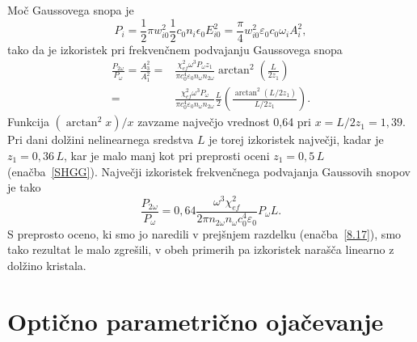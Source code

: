 Moč Gaussovega snopa je
\begin{equation}
P_{i}=\frac{1}{2}\pi w_{i0}^{2} \frac{1}{2}c_0 n_i \epsilon_{0}E_{i0}^{2}=
\frac{\pi}{4}w_{i0}^{2}\varepsilon_0 c_0 \omega_{i} A_{i}^{2},
\label{8.26}
\end{equation}
tako da je izkoristek pri frekvenčnem podvajanju Gaussovega snopa 
\begin{align}
\frac{P_{2\omega}}{P_{\omega}}=\frac{A_3^2}{A_1^2}  = &
\frac{\chi_{ef}^2 \omega^3 P_\omega z_1}{\pi c_0^4 \varepsilon_0 n_\omega n_{2\omega}} 
\arctan^2 \left( \frac{L}{2z_1}\right) \nonumber\\
 = &\frac{\chi_{ef}^2 \omega^3 P_\omega}{\pi c_0^4 \varepsilon_0 n_\omega n_{2\omega}} \frac{L}{2}
\left(\frac {\arctan^2 \left( L/2z_1\right)}{L/2z_1}\right)\!.
\label{8.27}
\end{align}
Funkcija $(\arctan^{2}x)/x$ zavzame največjo vrednost 0,64 pri $x =L/2z_1=1,39$.
Pri dani dolžini nelinearnega sredstva $L$ je torej 
izkoristek največji, kadar je $z_{1}=0,36\,L$, kar je malo manj kot pri
preprosti oceni $z_{1}=0,5\,L$ (enačba~\ref{SHGG}). Največji izkoristek
frekvenčnega podvajanja Gaussovih snopov je tako
\begin{equation}
\frac{P_{2\omega}}{P_{\omega}}
= 0,64 \frac{\omega^3 \chi_{ef}^2}{2\pi n_{2\omega} n_{\omega} c_0^4 \varepsilon_0 } P_\omega L.
\label{8.28}
\end{equation}
S preprosto oceno, ki smo jo naredili v prejšnjem razdelku (enačba~\ref{8.17}), smo tako 
rezultat le malo zgrešili, v obeh primerih pa izkoristek narašča linearno z dolžino kristala.

\section{Optično parametrično ojačevanje}

